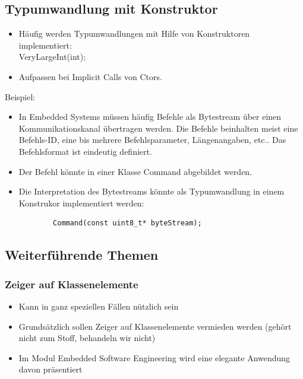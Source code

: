 \subsection{Typumwandlung mit Konstruktor}
\label{sec:Typumwandlung mit Konstruktor}
\begin{itemize}
	\item Häufig werden Typumwandlungen mit Hilfe von Konstruktoren implementiert:\\
	VeryLargeInt(int);
	\item \begin{achtung}
		  Aufpassen bei Implicit Calls von Ctors.
		  \end{achtung}
\end{itemize}
Beispiel:\\
\begin{itemize}
	\item In Embedded Systems müssen häufig Befehle als Bytestream über einen Kommunikationskanal übertragen werden. Die Befehle beinhalten meist eine Befehls-ID, eine bis mehrere Befehlsparameter, Längenangaben, etc.. Das Befehlsformat ist eindeutig definiert.
	\item Der Befehl könnte in einer Klasse Command abgebildet werden.
	\item Die Interpretation des Bytestreams könnte als Typumwandlung in einem Konstrukor implementiert werden:\\
	\noindent
	\begin{minipage}{\linewidth}
		\begin{lstlisting}
		Command(const uint8_t* byteStream);
		\end{lstlisting}
	\end{minipage}
\end{itemize}

\subsection{Weiterführende Themen}
\label{sec:Weiterführende Themen}

\subsubsection{Zeiger auf Klassenelemente}
\label{sec:Zeiger auf Klassenelemente}
\begin{itemize}
	\item Kann in ganz speziellen Fällen nützlich sein
	\item Grundsätzlich sollen Zeiger auf Klassenelemente vermieden werden (gehört nicht zum Stoff, behandeln wir nicht)
	\item Im Modul Embedded Software Engineering wird eine elegante Anwendung davon präsentiert
\end{itemize}

